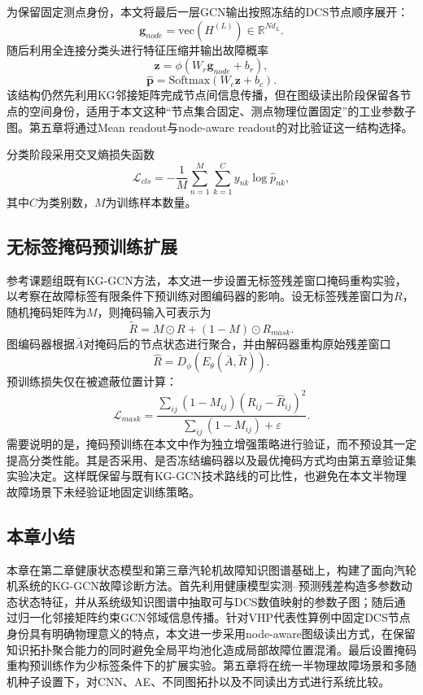 为保留固定测点身份，本文将最后一层GCN输出按照冻结的DCS节点顺序展开：
\begin{equation}
    \mathbf g_{node}=\mathrm{vec}\left(H^{(L)}\right)
    \in\mathbb R^{Nd_L}.
\end{equation}
随后利用全连接分类头进行特征压缩并输出故障概率
\begin{equation}
    \mathbf z=\phi(W_r\mathbf g_{node}+b_r),
\end{equation}
\begin{equation}
    \hat{\mathbf p}=\mathrm{Softmax}(W_c\mathbf z+b_c).
\end{equation}
该结构仍然先利用KG邻接矩阵完成节点间信息传播，但在图级读出阶段保留各节点的空间身份，适用于本文这种“节点集合固定、测点物理位置固定”的工业参数子图。第五章将通过Mean readout与node-aware readout的对比验证这一结构选择。

分类阶段采用交叉熵损失函数
\begin{equation}
    \mathcal L_{cls}=-\frac{1}{M}\sum_{n=1}^{M}\sum_{k=1}^{C}y_{nk}\log\hat p_{nk},
\end{equation}
其中$C$为类别数，$M$为训练样本数量。

\subsection{无标签掩码预训练扩展}
\label{subsec:mask_pretrain_v3}

参考课题组既有KG-GCN方法\cite{YangHaodong2026CFB}，本文进一步设置无标签残差窗口掩码重构实验，以考察在故障标签有限条件下预训练对图编码器的影响。设无标签残差窗口为$R$，随机掩码矩阵为$M$，则掩码输入可表示为
\begin{equation}
    \tilde R=M\odot R+(1-M)\odot R_{mask}.
\end{equation}
图编码器根据$\bar A$对掩码后的节点状态进行聚合，并由解码器重构原始残差窗口
\begin{equation}
    \hat R=D_{\phi}\left(E_{\theta}(\bar A,\tilde R)\right).
\end{equation}
预训练损失仅在被遮蔽位置计算：
\begin{equation}
    \mathcal L_{mask}=\frac{\sum_{ij}(1-M_{ij})(R_{ij}-\hat R_{ij})^2}{\sum_{ij}(1-M_{ij})+\varepsilon}.
\end{equation}
需要说明的是，掩码预训练在本文中作为独立增强策略进行验证，而不预设其一定提高分类性能。其是否采用、是否冻结编码器以及最优掩码方式均由第五章验证集实验决定。这样既保留与既有KG-GCN技术路线的可比性，也避免在本文半物理故障场景下未经验证地固定训练策略。

\subsection{本章小结}

本章在第二章健康状态模型和第三章汽轮机故障知识图谱基础上，构建了面向汽轮机系统的KG-GCN故障诊断方法。首先利用健康模型实测--预测残差构造多参数动态状态特征，并从系统级知识图谱中抽取可与DCS数值映射的参数子图；随后通过归一化邻接矩阵约束GCN邻域信息传播。针对VHP代表性算例中固定DCS节点身份具有明确物理意义的特点，本文进一步采用node-aware图级读出方式，在保留知识拓扑聚合能力的同时避免全局平均池化造成局部故障位置混淆。最后设置掩码重构预训练作为少标签条件下的扩展实验。第五章将在统一半物理故障场景和多随机种子设置下，对CNN、AE、不同图拓扑以及不同读出方式进行系统比较。